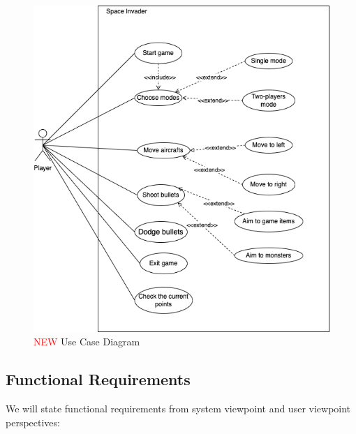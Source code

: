 \documentclass[12pt]{article}
\begin{document}
\begin{figure}[h!]
\begin{center}
\includegraphics[scale=0.8]{Revised_Use_Case.png}
\end{center}
\caption{\textcolor{red}{NEW} Use Case Diagram}
\end{figure}
\newpage


\subsection{Functional Requirements}
We will state functional requirements from system viewpoint
and user viewpoint perspectives:
\end{document}
